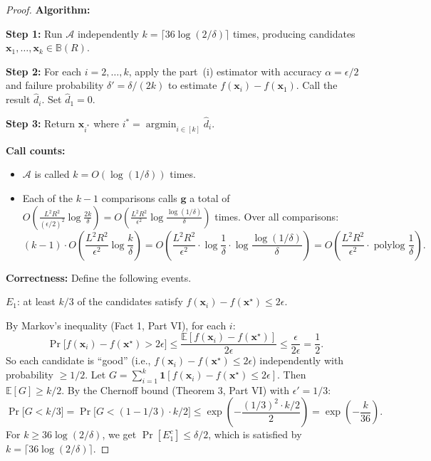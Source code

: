 \begin{proof}
\textbf{Algorithm:}

\textbf{Step 1:} Run $\mathcal{A}$ independently $k = \lceil 36\log(2/\delta) \rceil$ times, producing candidates $\mathbf{x}_1, \ldots, \mathbf{x}_k \in \mathbb{B}(R)$.

\textbf{Step 2:} For each $i = 2, \ldots, k$, apply the part~(i) estimator with accuracy $\alpha = \epsilon/2$ and failure probability $\delta' = \delta/(2k)$ to estimate $f(\mathbf{x}_i) - f(\mathbf{x}_1)$. Call the result $\hat{d}_i$. Set $\hat{d}_1 = 0$.

\textbf{Step 3:} Return $\mathbf{x}_{i^*}$ where $i^* = \operatorname{argmin}_{i \in [k]} \hat{d}_i$.

\medskip
\textbf{Call counts:}
\begin{itemize}
\item $\mathcal{A}$ is called $k = O(\log(1/\delta))$ times.
\item Each of the $k - 1$ comparisons calls $\mathbf{g}$ a total of $O\!\left(\frac{L^2R^2}{(\epsilon/2)^2}\log\frac{2k}{\delta}\right) = O\!\left(\frac{L^2R^2}{\epsilon^2}\log\frac{\log(1/\delta)}{\delta}\right)$ times. Over all comparisons:
\[
(k-1) \cdot O\!\left(\frac{L^2R^2}{\epsilon^2}\log\frac{k}{\delta}\right) = O\!\left(\frac{L^2R^2}{\epsilon^2}\cdot\log\frac{1}{\delta}\cdot\log\frac{\log(1/\delta)}{\delta}\right) = O\!\left(\frac{L^2R^2}{\epsilon^2}\cdot\operatorname{polylog}\frac{1}{\delta}\right).
\]
\end{itemize}

\textbf{Correctness:}
Define the following events.

$E_1$: at least $k/3$ of the candidates satisfy $f(\mathbf{x}_i) - f(\mathbf{x}^\star) \leq 2\epsilon$.

By Markov's inequality (Fact 1, Part VI), for each $i$:
\[
\Pr\bigl[f(\mathbf{x}_i) - f(\mathbf{x}^\star) > 2\epsilon\bigr] \leq \frac{\mathbb{E}[f(\mathbf{x}_i) - f(\mathbf{x}^\star)]}{2\epsilon} \leq \frac{\epsilon}{2\epsilon} = \frac{1}{2}.
\]
So each candidate is ``good'' (i.e., $f(\mathbf{x}_i) - f(\mathbf{x}^\star) \leq 2\epsilon$) independently with probability $\geq 1/2$. Let $G = \sum_{i=1}^k \mathbf{1}[f(\mathbf{x}_i) - f(\mathbf{x}^\star) \leq 2\epsilon]$. Then $\mathbb{E}[G] \geq k/2$. By the Chernoff bound (Theorem 3, Part VI) with $\epsilon' = 1/3$:
\[
\Pr\bigl[G < k/3\bigr] = \Pr\bigl[G < (1-1/3) \cdot k/2\bigr] \leq \exp\!\left(-\frac{(1/3)^2 \cdot k/2}{2}\right) = \exp\!\left(-\frac{k}{36}\right).
\]
For $k \geq 36\log(2/\delta)$, we get $\Pr[E_1^c] \leq \delta/2$, which is satisfied by $k = \lceil 36\log(2/\delta) \rceil$.


\end{proof}
